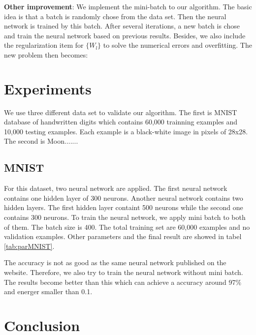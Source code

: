 \documentclass[letterpaper, 10 pt, conference]{ieeeconf}  %
\begin{document}
\textbf{Other improvement}: We implement the mini-batch to our algorithm. The basic idea is that a batch is randomly chose from the data set. Then the neural network is trained by this batch. After several iterations, a new batch is chose and train the neural network based on previous results. Besides, we also include the regularization item for $\{W_l\}$ to solve the numerical errors and overfitting. The new problem then becomes:


\section{Experiments} \label{experiment}
We use three different data set to validate our algorithm. The first is MNIST database of handwritten digits which contains 60,000 trainning examples and 10,000 testing examples. Each example is a black-white image in pixels of 28x28. The second is Moon.......



\subsection{MNIST}
For this dataset, two neural network are applied. The first neural network contains one hidden layer of 300 neurons. Another neural network contains two hidden layers. The first hidden layer containt 500 neurons while the second one contains 300 neurons. To train the neural network, we apply mini batch to both of them. The batch size is 400. The total training set are 60,000 examples and no validation examples. Other parameters and the final result are showed in tabel \ref{tab:parMNIST}.


The accuracy is not as good as the same neural network published on the website. Therefore, we also try to train the neural network without mini batch. The results become better than this which can achieve a accuracy around 97\% and energer smaller than 0.1. 
\section{Conclusion} \label{conclusion}

\end{document}
